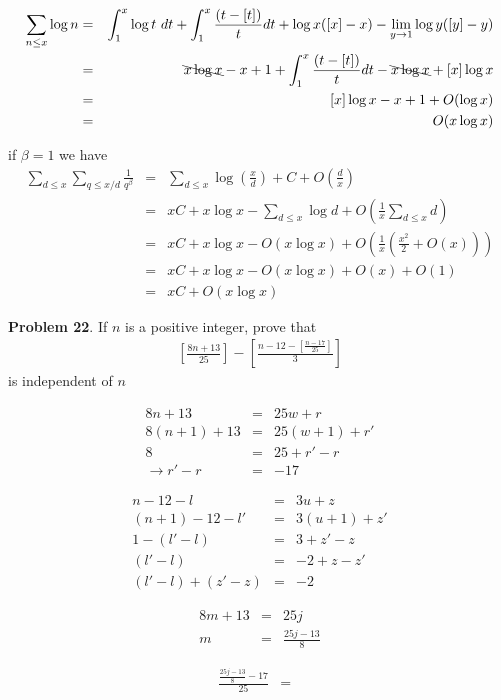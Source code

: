 \documentclass[aps,preprint,preprintnumbers,nofootinbib,showpacs,prd]{revtex4-1}
\newcommand{\nbea}{\begin{eqnarray*}}
\newcommand{\neea}{\end{eqnarray*}}
\begin{document}
%
\nbea
\sum_{n\le x} \log n & = & \int_1^x \log t ~dt + \int _1^x \frac{(t - [t]) }{t} dt + \log x ([x] - x) - \lim_{y\to 1} \log y ([y] - y) \\
& = & \bcancel{ x \log x} - x + 1 + \int _1^x \frac{(t - [t]) }{t} dt - \bcancel{x \log x}  + [x]\log x \\
& = & [x]\log x - x + 1 + O(\log x) \\
& = & O(x \log x)
\neea
%

if $\beta = 1$ we have
%
\nbea
\sum_{d\le x} \sum_{q\le x/d}\frac{1}{q^\beta} & = & \sum_{d\le x} \log \left ( \frac{x}{d}\right ) + C + O\left ( \frac{d}{x}\right ) \\
& = & xC + x \log x - \sum_{d\le x} \log d + O\left ( \frac{1}{x} \sum_{d\le x} d\right ) \\
& = & xC + x \log x - O(x \log x) + O\left ( \frac{1}{x} \left (\frac{x^2}{2} + O(x)\right )\right ) \\
& = & xC + x \log x - O(x \log x) + O(x) + O(1)\\
& = & xC + O(x \log x)
\neea
%

{\bf Problem 22}. If $n$ is a positive integer, prove that
%
\nbea
\left \lbrack \frac{8n + 13}{25} \right \rbrack - \left \lbrack \frac{n - 12 - \left \lbrack \frac{n-17}{25}\right \rbrack}{3} \right \rbrack
\neea
%
is independent of $n$

%
\nbea
8n + 13 & = & 25w + r \\
8(n+1) + 13 & = & 25(w+1) + r' \\
8 & = & 25 + r' - r \\
\to r' - r & = & -17
\neea
%


%
\nbea
n-12 - l & = & 3u + z \\
(n+1) -12 - l' & = & 3(u+1) + z' \\
1 - (l' - l) & = & 3 + z' - z \\
(l'-l) & = & -2 + z - z' \\
(l'-l) +(z'-z) & = & -2
\neea
%

%
\nbea
8m + 13 & = & 25j \\
m & = & \frac{25j - 13}{8}
\neea
%

%
\nbea
\frac{\frac{25j - 13}{8} - 17}{25} & = & 
\neea
%
\end{document}
